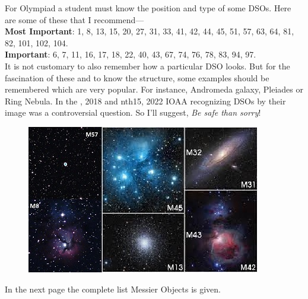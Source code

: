 \documentclass[a4paper,12pt]{extarticle}
\begin{document}
For Olympiad a student must know the position and type of some DSOs. Here are some of these that I recommend---\\

\textbf{Most Important}: {\color{red} 1, 8, 13, 15, 20, 27, 31, 33, 41, 42, 44, 45, 51, 57, 63, 64, 81, 82, 101, 102, 104.}\\

\textbf{Important}: 6, 7, 11, 16, 17, 18, 22, 40, 43, 67, 74, 76, 78, 83, 94, 97.\\

It is not customary to also remember how a particular DSO looks. But for the fascination of these and to know the structure, some examples should be remembered which are very popular. For instance, Andromeda galaxy, Pleiades or Ring Nebula. In the , 2018 and nth{15}, 2022 IOAA recognizing DSOs by their image was a controversial question. So I'll suggest, \textit{Be safe than sorry}!  

\begin{figure}[H]
    \centering
    \includegraphics[width=0.8\linewidth]{m_o.jpg}
\end{figure}

In the next page the complete list Messier Objects is given. 
\end{document}
